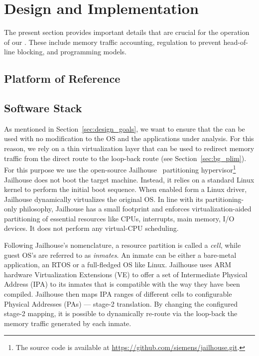 \section{\schim Design and Implementation}
\label{sec:schim_implmentation}

The present section provides important details that are crucial for
the operation of our \schim. These include memory traffic accounting,
regulation to prevent head-of-line blocking, and programming models.


\subsection{Platform of Reference}

\subsection{Software Stack}
As mentioned in Section~\ref{sec:design_goals}, we want to ensure that
the \schim can be used with no modification to the OS and the
applications under analysis. For this reason, we rely on a thin
virtualization layer that can be used to redirect memory traffic from
the direct route to the loop-back route (see
Section~\ref{sec:bg_plim}). For this purpose we use the open-source
Jailhouse~\cite{jailhouse} partitioning hypervisor\footnote{The source
  code is available at
  \url{https://github.com/siemens/jailhouse.git}.}  Jailhouse does not
boot the target machine. Instead, it relies on a standard Linux kernel
to perform the initial boot sequence. When enabled form a Linux
driver, Jailhouse dynamically virtualizes the original OS. In line
with its partitioning-only philosophy, Jailhouse has a small footprint
and enforces virtualization-aided partitioning of essential resources
like CPUs, interrupts, main memory, I/O devices. It does not perform
any virtual-CPU scheduling.

Following Jailhouse's nomenclature, a resource partition is called a
\emph{cell}, while guest OS's are referred to as \emph{inmates}. An
inmate can be either a bare-metal application, an RTOS or a
full-fledged OS like Linux. Jailhouse uses ARM hardware Virtualization
Extensions (VE) to offer a set of Intermediate Physical Address (IPA)
to its inmates that is compatible with the way they have been
compiled. Jailhouse then maps IPA ranges of different cells to
configurable Physical Addresses (PAs) --- stage-2 translation. By
changing the configured stage-2 mapping, it is possible to dynamically
re-route via the loop-back the memory traffic generated by each
inmate. 

